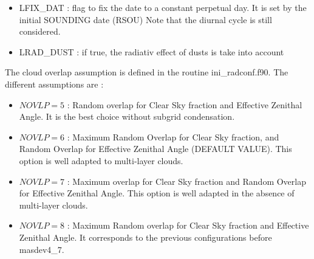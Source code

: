 \begin{itemize}
\item
{}
LFIX\_DAT : flag to fix the date to a constant perpetual day. It is set by the initial SOUNDING date (RSOU) 
            Note that the diurnal cycle is still considered.
\item
{}
LRAD\_DUST : if true, the radiativ effect of dusts is take into account
\end{itemize}

The cloud overlap assumption is defined in the routine ini\_radconf.f90.
The different assumptions are :
\begin{itemize}
\item
$NOVLP=5 $ : Random overlap for Clear Sky fraction and Effective Zenithal Angle.
It is the best choice without subgrid condensation.

\item
$NOVLP=6 $ : Maximum Random Overlap for Clear Sky fraction,
and Random Overlap for Effective Zenithal Angle (DEFAULT VALUE). 
This option is well adapted to multi-layer clouds.

\item
$NOVLP=7 $ : Maximum overlap for Clear Sky fraction and Random Overlap
for Effective Zenithal Angle. This option is well adapted in the absence of multi-layer clouds.

\item
$NOVLP=8 $ : Maximum Random overlap for Clear Sky fraction and 
Effective Zenithal Angle. It corresponds to the previous configurations before  masdev4\_7.
\end{itemize}

